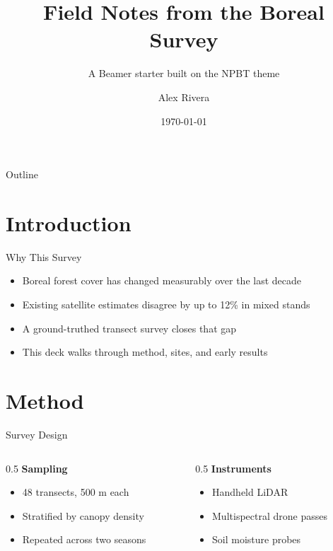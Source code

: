 \documentclass{beamer}
\title{Field Notes from the Boreal Survey}
\subtitle{A Beamer starter built on the NPBT theme}
\author{Alex Rivera}
\institute{Department of Environmental Science}
\date{\today}
\begin{document}
\begin{frame}
  \titlepage
\end{frame}

\begin{frame}{Outline}
  \tableofcontents
\end{frame}

\section{Introduction}

\begin{frame}{Why This Survey}
  \begin{itemize}
    \item Boreal forest cover has changed measurably over the last decade
    \item Existing satellite estimates disagree by up to 12\% in mixed stands
    \item A ground-truthed transect survey closes that gap
    \item This deck walks through method, sites, and early results
  \end{itemize}
\end{frame}

\section{Method}

\begin{frame}{Survey Design}
  \begin{columns}[T]
    \begin{column}{0.5\textwidth}
      \textbf{Sampling}
      \begin{itemize}
        \item 48 transects, 500 m each
        \item Stratified by canopy density
        \item Repeated across two seasons
      \end{itemize}
    \end{column}
    \begin{column}{0.5\textwidth}
      \textbf{Instruments}
      \begin{itemize}
        \item Handheld LiDAR
        \item Multispectral drone passes
        \item Soil moisture probes
      \end{itemize}
    \end{column}
  \end{columns}
\end{frame}
\end{document}
